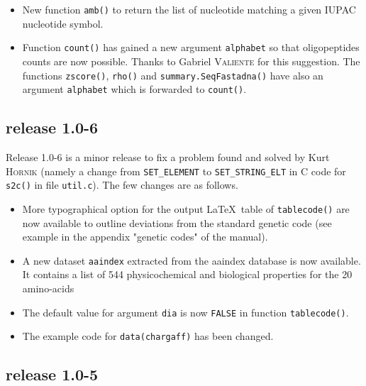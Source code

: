 \documentclass{article}
\begin{document}
\begin{itemize}
\item New function \texttt{amb()} to return the list of nucleotide matching 
a given IUPAC nucleotide symbol.

\item Function \texttt{count()} has gained a new argument \texttt{alphabet}
so that oligopeptides counts are now possible. Thanks to Gabriel \textsc{Valiente}
for this suggestion. The functions \texttt{zscore()}, \texttt{rho()} and
\texttt{summary.SeqFastadna()} have also an argument \texttt{alphabet} which
is forwarded to \texttt{count()}.

\end{itemize}

\subsection*{release 1.0-6}

Release 1.0-6 is a minor release to fix a problem found and solved by Kurt \textsc{Hornik}
(namely a change from \texttt{SET\_ELEMENT} to \texttt{SET\_STRING\_ELT}
in C code for \texttt{s2c()} in file \texttt{util.c}). The few changes are
as follows.

\begin{itemize}

\item More typographical option for the output \LaTeX~table of \texttt{tablecode()}
are now available to outline deviations from the standard genetic code (see example in the
appendix "genetic codes" of the manual).

\item A new dataset \texttt{aaindex} extracted from the aaindex database
\cite{aaindex1, aaindex2, aaindex3} is now available. It contains a list
of 544 physicochemical and biological properties for the 20 amino-acids

\item The default value for argument \texttt{dia} is now \texttt{FALSE}
in function \texttt{tablecode()}.

\item The example code for \texttt{data(chargaff)} has been changed.

\end{itemize}

\subsection*{release 1.0-5}
\end{document}
